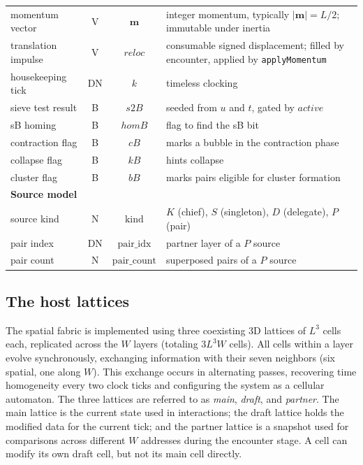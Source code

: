 \documentclass{ijuc}
\begin{document}
\begin{table}[htbp]
\begin{tabular}{|l|c|c|l|}
momentum vector & V & $\boldsymbol{m}$ & integer momentum, typically $\lvert\boldsymbol{m}\rvert=L/2$; immutable under inertia \\
translation impulse & V & $\mathit{reloc}$ & consumable signed displacement; filled by encounter, applied by \texttt{applyMomentum} \\
housekeeping tick & DN & $k$ & timeless clocking \\
sieve test result & B & $s2B$ & seeded from $u$ and $t$, gated by $\mathit{active}$ \\
sB homing & B & $homB$ & flag to find the sB bit \\
contraction flag & B & $cB$ & marks a bubble in the contraction phase \\
collapse flag & B & $kB$ & hints collapse \\
cluster flag & B & $bB$ & marks pairs eligible for cluster formation \\
\hline
\textbf{Source model} & & & \\
\hline
source kind & N & $\mathrm{kind}$ & $K$ (chief), $S$ (singleton), $D$ (delegate), $P$ (pair) \\
pair index & DN & $\mathrm{pair\_idx}$ & partner layer of a $P$ source \\
pair count & N & $\mathrm{pair\_count}$ & superposed pairs of a $P$ source \\
\hline
\end{tabular}
\end{table}

\subsection{The host lattices}
\label{subsec:The-host-lattice}

The spatial fabric is implemented using three coexisting 3D lattices of $L^3$ cells each, replicated across the $W$ layers (totaling $3L^3W$ cells). All cells within a layer evolve synchronously, exchanging information with their seven neighbors (six spatial, one along $W$). This exchange occurs in alternating passes, recovering time homogeneity every two clock ticks and configuring the system as a cellular automaton. The three lattices are referred to as \emph{main}, \emph{draft}, and \emph{partner}. The main lattice is the current state used in interactions; the draft lattice holds the modified data for the current tick; and the partner lattice is a snapshot used for comparisons across different $W$ addresses during the encounter stage. A cell can modify its own draft cell, but not its main cell directly.
\end{document}

